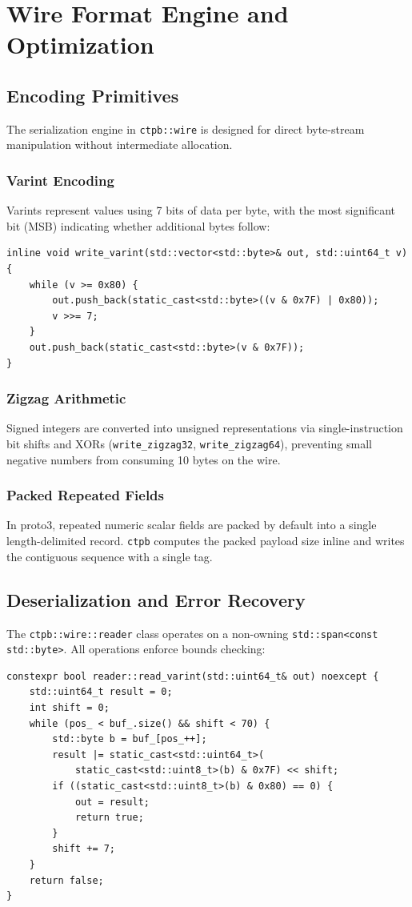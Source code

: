 \section{Wire Format Engine and Optimization}

\subsection{Encoding Primitives}
The serialization engine in \texttt{ctpb::wire} is designed for direct byte-stream manipulation without intermediate allocation.

\subsubsection{Varint Encoding}
Varints represent values using 7 bits of data per byte, with the most significant bit (MSB) indicating whether additional bytes follow:
\begin{lstlisting}[language=ModernC++, caption={Varint Encoding Routine}]
inline void write_varint(std::vector<std::byte>& out, std::uint64_t v) {
    while (v >= 0x80) {
        out.push_back(static_cast<std::byte>((v & 0x7F) | 0x80));
        v >>= 7;
    }
    out.push_back(static_cast<std::byte>(v & 0x7F));
}
\end{lstlisting}

\subsubsection{Zigzag Arithmetic}
Signed integers are converted into unsigned representations via single-instruction bit shifts and XORs (\texttt{write\_zigzag32}, \texttt{write\_zigzag64}), preventing small negative numbers from consuming 10 bytes on the wire.

\subsubsection{Packed Repeated Fields}
In proto3, repeated numeric scalar fields are packed by default into a single length-delimited record. \texttt{ctpb} computes the packed payload size inline and writes the contiguous sequence with a single tag.

\subsection{Deserialization and Error Recovery}
The \texttt{ctpb::wire::reader} class operates on a non-owning \texttt{std::span<const std::byte>}. All operations enforce bounds checking:
\begin{lstlisting}[language=ModernC++, caption={Bounds-Checked Varint Decoding}]
constexpr bool reader::read_varint(std::uint64_t& out) noexcept {
    std::uint64_t result = 0;
    int shift = 0;
    while (pos_ < buf_.size() && shift < 70) {
        std::byte b = buf_[pos_++];
        result |= static_cast<std::uint64_t>(
            static_cast<std::uint8_t>(b) & 0x7F) << shift;
        if ((static_cast<std::uint8_t>(b) & 0x80) == 0) {
            out = result;
            return true;
        }
        shift += 7;
    }
    return false;
}
\end{lstlisting}

